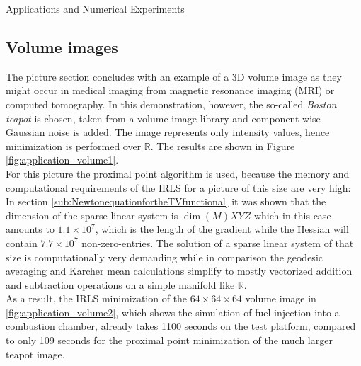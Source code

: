 \begin{chapter}{Applications and Numerical Experiments}
\FloatBarrier
\subsection{Volume images} %
\label{sub:Volume images}
The picture section concludes with an example of a 3D volume image as they might occur in medical imaging from magnetic resonance imaging (MRI) or
computed tomography. In this demonstration, however, the so-called \emph{Boston teapot} is chosen, taken from a volume image library \cite{volvis}
and component-wise Gaussian noise is added. The image represents only intensity values, hence minimization is performed over $\mathbb{R}$. The results are shown
in Figure \ref{fig:application_volume1}.\\

For this picture the proximal point algorithm is used, because the memory and computational requirements of the IRLS for a picture of this size are very high:
In section \ref{sub:NewtonequationfortheTVfunctional} it was shown that the dimension of the sparse linear system is $\operatorname{dim}(M)XYZ$ which
in this case amounts to $1.1\times 10^{7}$, which is the length of the gradient while the Hessian will contain $7.7\times 10^{7}$ non-zero-entries.
The solution of a sparse linear system of that size is computationally very demanding while in comparison the geodesic averaging and Karcher mean calculations
simplify to mostly vectorized addition and subtraction operations on a simple manifold like $\mathbb{R}$.\\

As a result, the IRLS minimization of the $64\times 64 \times 64$ volume image in \ref{fig:application_volume2}, which
shows the simulation of fuel injection into a combustion chamber, already takes 1100 seconds on the test platform, compared to
only 109 seconds for the proximal point minimization of the much larger teapot image.


\end{chapter}
